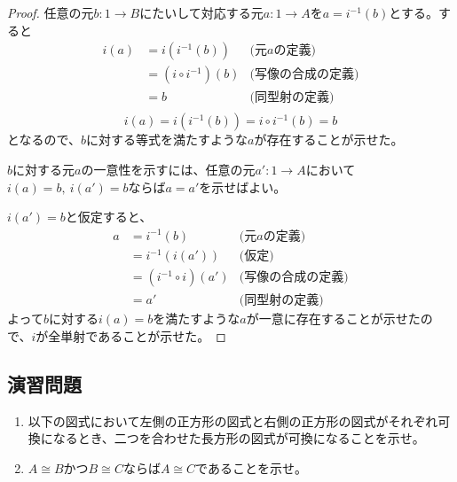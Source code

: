 \documentclass[dvipdfmx]{jsarticle}
\newcommand{\arrow}{\rightarrow}
\newcommand{\mor}[3]{#1:#2\arrow #3}
\newtheorem{proof}{証明}[section]
\numberwithin{proof}{subsection}
\numberwithin{prop}{subsection}
\numberwithin{define}{subsection}
\begin{document}
	\begin{proof}
		任意の元$\mor{b}{1}{B}$にたいして対応する元$\mor{a}{1}{A}$を$a=i^{-1}(b)$とする。すると
		\begin{align*}
			i(a)&=i(i^{-1}(b))&\text{(元$a$の定義)}\\
			&=(i\circ i^{-1})(b)&\text{(写像の合成の定義)}\\
			&=b&\text{(同型射の定義)}\\
		\end{align*}
		\[i(a)=i(i^{-1}(b))=i\circ i^{-1}(b)=b\]となるので、$b$に対する等式を満たすような$a$が存在することが示せた。

		$b$に対する元$a$の一意性を示すには、任意の元$\mor{a'}{1}{A}$において$i(a)=b,\ i(a')=b$ならば$a=a'$を示せばよい。

		$i(a')=b$と仮定すると、
		\begin{align*}
			a&=i^{-1}(b)&\text{(元$a$の定義)}\\
			　&=i^{-1}(i(a'))&\text{(仮定)}\\
			　&=(i^{-1}\circ i)(a')&\text{(写像の合成の定義)}\\
			　&=a'&\text{(同型射の定義)}
		\end{align*}
		よって$b$に対する$i(a)=b$を満たすような$a$が一意に存在することが示せたので、$i$が全単射であることが示せた。
	\end{proof}
	\subsection{演習問題}
	\begin{enumerate}
		\item 以下の図式において左側の正方形の図式と右側の正方形の図式がそれぞれ可換になるとき、二つを合わせた長方形の図式が可換になることを示せ。
			\begin{center}
			\end{center}
		\item $A\cong B$かつ$B\cong C$ならば$A\cong C$であることを示せ。
	\end{enumerate}
\end{document}
